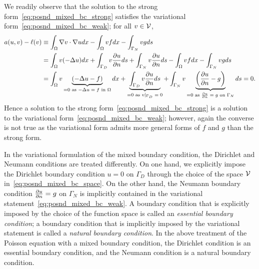 We readily observe that the solution to the strong form~\eqref{eq:posnd_mixed_bc_strong} satisfies the variational form~\eqref{eq:posnd_mixed_bc_weak};  for all $v \in \mathcal{V}$,
\begin{align*}
  a(u,v) - \ell(v)
  &\equiv \int_\Omega \nabla v \cdot \nabla u dx - \int_\Omega vf dx - \int_{\Gamma_N} vg ds
  \\
  &= \int_\Omega v (-\Delta u) dx + \int_{\Gamma_D} v \frac{\partial u}{\partial n} ds + \int_{\Gamma_N} v \frac{\partial u}{\partial n} ds  - \int_\Omega vf dx - \int_{\Gamma_N} vg ds
  \\
  &= \int_\Omega v \underbrace{ (-\Delta u - f) }_{= 0 \text{ as $-\Delta u=  f$ in $\Omega$}} dx
  + \underbrace{ \int_{\Gamma_D} v \frac{\partial u}{\partial n} ds }_{= 0 \text{ as $v|_{\Gamma_D} = 0$}}
  + \int_{\Gamma_N} v \underbrace{ \left( \frac{\partial u}{\partial n} - g \right) }_{= 0 \text{ as $\frac{\partial u}{\partial n} = g$ on $\Gamma_N$}}ds = 0.
\end{align*}
Hence a solution to the strong form~\eqref{eq:posnd_mixed_bc_strong} is a solution to the variational form~\eqref{eq:posnd_mixed_bc_weak}; however, again the converse is not true as the variational form admits more general forms of $f$ and $g$ than the strong form.

In the variational formulation of the mixed boundary condition, the Dirichlet and Neumann conditions are treated differently.  On one hand, we explicitly impose the Dirichlet boundary condition $u = 0$ on $\Gamma_D$ through the choice of the space $\mathcal{V}$ in~\eqref{eq:posnd_mixed_bc_space}. On the other hand, the Neumann boundary condition $\frac{\partial u}{\partial n} = g$ on $\Gamma_N$ is implicitly contained in the variational statement~\eqref{eq:posnd_mixed_bc_weak}.  A boundary condition that is explicitly imposed by the choice of the function space is called an \emph{essential boundary condition}; a boundary condition that is implicitly imposed by the variational statement is called a \emph{natural boundary condition}.  In the above treatment of the Poisson equation with a mixed boundary condition, the Dirichlet condition is an essential boundary condition, and the Neumann condition is a natural boundary condition.




